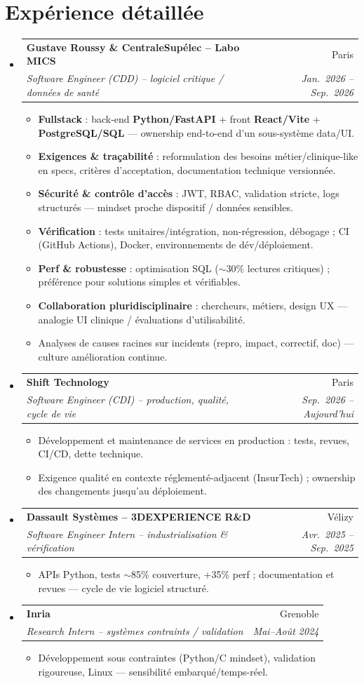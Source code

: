 \documentclass[a4paper,10.5pt]{article}
\makeatletter
\newcommand{\resumeItem}[1]{\item\small{#1}}
\newcommand{\resumeSubheading}[4]{\vspace{2.5pt}\item\begin{tabular*}{0.97\textwidth}[t]{l@{\extracolsep{\fill}}r}\textbf{#1}&{#2}\\\textit{\small #3}&\textit{\small #4}\\\end{tabular*}\vspace{1pt}}
\newcommand{\resumeSubHeadingListStart}{\begin{itemize}[leftmargin=0.08in,label={}]}
\newcommand{\resumeSubHeadingListEnd}{\end{itemize}}
\makeatother
\begin{document}
\section{Exp\'erience d\'etaill\'ee}
\resumeSubHeadingListStart
  \resumeSubheading
    {Gustave Roussy \& CentraleSup\'elec -- Labo MICS}{Paris}
    {Software Engineer (CDD) -- logiciel critique / donn\'ees de sant\'e}{Jan.~2026 -- Sep.~2026}
    \begin{itemize}
      \resumeItem{\textbf{Fullstack} : back-end \textbf{Python/FastAPI} + front \textbf{React/Vite} + \textbf{PostgreSQL/SQL} --- ownership end-to-end d'un sous-syst\`eme data/UI.}
      \resumeItem{\textbf{Exigences \& tra\c{c}abilit\'e} : reformulation des besoins m\'etier/clinique-like en specs, crit\`eres d'acceptation, documentation technique versionn\'ee.}
      \resumeItem{\textbf{S\'ecurit\'e \& contr\^ole d'acc\`es} : JWT, RBAC, validation stricte, logs structur\'es --- mindset proche dispositif / donn\'ees sensibles.}
      \resumeItem{\textbf{V\'erification} : tests unitaires/int\'egration, non-r\'egression, d\'ebogage ; CI (GitHub Actions), Docker, environnements de d\'ev/d\'eploiement.}
      \resumeItem{\textbf{Perf \& robustesse} : optimisation SQL ($\sim$30\% lectures critiques) ; pr\'ef\'erence pour solutions simples et v\'erifiables.}
      \resumeItem{\textbf{Collaboration pluridisciplinaire} : chercheurs, m\'etiers, design UX --- analogie UI clinique / \'evaluations d'utilisabilit\'e.}
      \resumeItem{Analyses de causes racines sur incidents (repro, impact, correctif, doc) --- culture am\'elioration continue.}
    \end{itemize}
  \resumeSubheading
    {Shift Technology}{Paris}
    {Software Engineer (CDI) -- production, qualit\'e, cycle de vie}{Sep.~2026 -- Aujourd'hui}
    \begin{itemize}
      \resumeItem{D\'eveloppement et maintenance de services en production : tests, revues, CI/CD, dette technique.}
      \resumeItem{Exigence qualit\'e en contexte r\'eglement\'e-adjacent (InsurTech) ; ownership des changements jusqu'au d\'eploiement.}
    \end{itemize}
  \resumeSubheading
    {Dassault Syst\`emes -- 3DEXPERIENCE R\&D}{V\'elizy}
    {Software Engineer Intern -- industrialisation \& v\'erification}{Avr.~2025 -- Sep.~2025}
    \begin{itemize}
      \resumeItem{APIs Python, tests $\sim$85\% couverture, +35\% perf ; documentation et revues --- cycle de vie logiciel structur\'e.}
    \end{itemize}
  \resumeSubheading
    {Inria}{Grenoble}
    {Research Intern -- syst\`emes contraints / validation}{Mai--Ao\^ut 2024}
    \begin{itemize}
      \resumeItem{D\'eveloppement sous contraintes (Python/C mindset), validation rigoureuse, Linux --- sensibilit\'e embarqu\'e/temps-r\'eel.}
    \end{itemize}
\resumeSubHeadingListEnd
\end{document}
